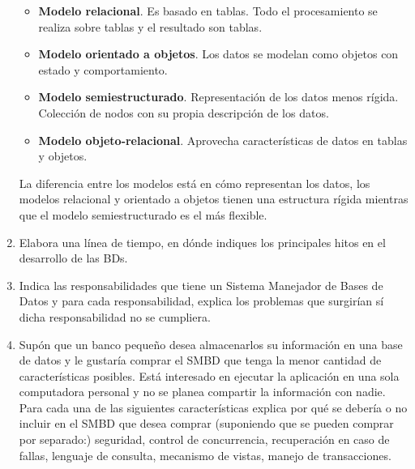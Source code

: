 \documentclass{article}
\begin{document}
\begin{enumerate}
\begin{itemize}
		\item \textbf{Modelo relacional}. Es basado en tablas. Todo el procesamiento se realiza sobre tablas y el resultado son tablas.
		\item \textbf{Modelo orientado a objetos}. Los datos se modelan como objetos con estado y comportamiento.

		\item \textbf{Modelo semiestructurado}. Representación de los datos menos rígida. Colección de nodos con su propia descripción de los datos.

		\item \textbf{Modelo objeto-relacional}. Aprovecha características de datos en tablas y objetos. 

	\end{itemize}

	La diferencia entre los modelos está en cómo representan los datos, los modelos relacional y orientado a objetos tienen una estructura rígida mientras que el modelo semiestructurado es el más flexible.

          \item Elabora una línea de tiempo, en dónde indiques los principales hitos en el desarrollo de las BDs.
          \item Indica las responsabilidades que tiene un Sistema Manejador de Bases de Datos y para cada responsabilidad, explica los problemas que surgirían sí dicha responsabilidad no se cumpliera.
          \item Supón que un banco pequeño desea almacenarlos su información en una base de datos y le gustaría comprar el SMBD que tenga la menor cantidad de características posibles. Está interesado en ejecutar la aplicación en una sola computadora personal y no se planea compartir la información con nadie. Para cada una de las siguientes características explica por qué se debería o no incluir en el SMBD que desea comprar (suponiendo que se pueden comprar por separado:) seguridad, control de concurrencia, recuperación en caso de fallas, lenguaje de consulta, mecanismo de vistas, manejo de transacciones.
          \end{enumerate} 
\end{document}
